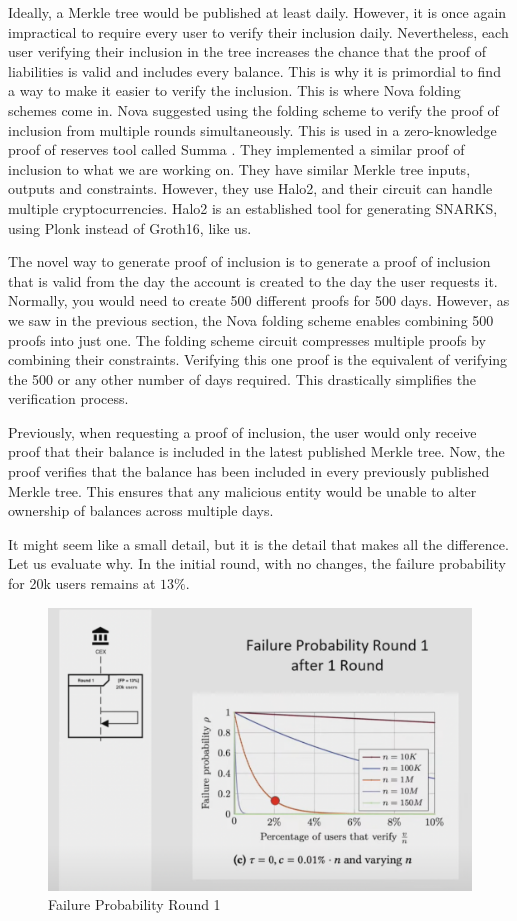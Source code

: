 Ideally, a Merkle tree would be published at least daily. However, it is once again impractical to require every user to verify their inclusion daily.
Nevertheless, each user verifying their inclusion in the tree increases the chance that the proof of liabilities is valid and includes every balance.
This is why it is primordial to find a way to make it easier to verify the inclusion. This is where Nova folding schemes come in.
Nova suggested using the folding scheme to verify the proof of inclusion from multiple rounds simultaneously\cite{NS23}. 
This is used in a zero-knowledge proof of reserves tool called Summa \cite{Summa24}.
They implemented a similar proof of inclusion to what we are working on. They have similar Merkle tree inputs, outputs and constraints. However, they 
use Halo2, and their circuit can handle multiple cryptocurrencies. Halo2 is an established tool for generating SNARKS, using Plonk instead of Groth16, like us.


The novel way to generate proof of inclusion is to generate a proof of inclusion that is valid from the day the account is created to the day the user requests it.
Normally, you would need to create 500 different proofs for 500 days. However, as we saw in the previous section, the Nova folding scheme enables combining 500 proofs into just one.
The folding scheme circuit compresses multiple proofs by combining their constraints.
Verifying this one proof is the equivalent of verifying the 500 or any other number of days required.
This drastically simplifies the verification process.

Previously, when requesting a proof of inclusion, the user would only receive proof that their balance is included in the latest published Merkle tree. Now, the proof verifies that the balance has been included in every previously published Merkle tree. 
This ensures that any malicious entity would be unable to alter ownership of balances across multiple days. 

It might seem like a small detail, but it is the detail that makes all the difference. Let us evaluate why.
In the initial round, with no changes, the failure probability for 20k users remains at $13\%$.

\begin{figure}[H]
   \centering
   \includegraphics[width=130mm]{FailureProbabilityRound1.png}
   \caption{Failure Probability Round 1 \cite{NS23}}
   \label{overflow}
   \end{figure}

